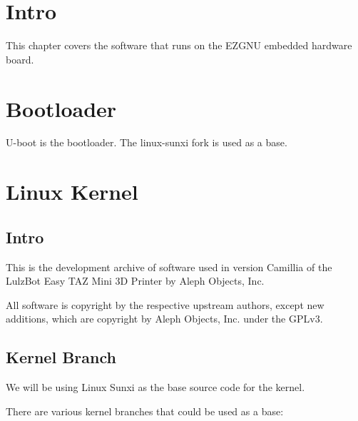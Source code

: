 %
%
%
%
%
\section{Intro}
This chapter covers the software that runs on the EZGNU embedded hardware board.


\section{Bootloader}
U-boot is the bootloader. The linux-sunxi fork is used as a base.


\section{Linux Kernel}

\subsection{Intro}

This is the development archive of software used in version Camillia of the
LulzBot Easy TAZ Mini 3D Printer by Aleph Objects, Inc.

All software is copyright by the respective upstream authors, except new
additions, which are copyright by Aleph Objects, Inc. under the GPLv3.



\subsection{Kernel Branch}

We will be using Linux Sunxi as the base source code for the kernel.


There are various kernel branches that could be used as a base:

